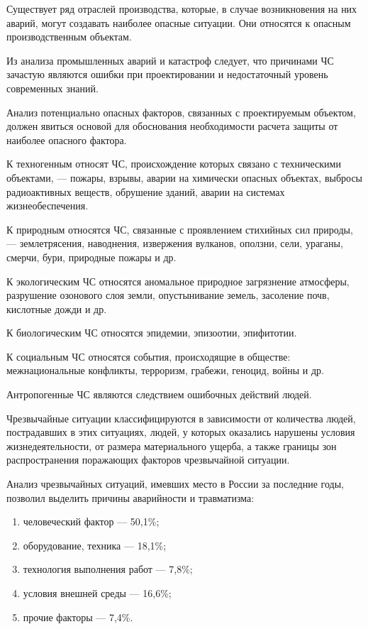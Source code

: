 Существует ряд отраслей производства, которые, в случае возникновения на них аварий, могут создавать наиболее опасные ситуации.
Они относятся к опасным производственным объектам. 

Из анализа промышленных аварий и катастроф следует, что причинами ЧС зачастую являются ошибки при проектировании и недостаточный уровень современных знаний.

Анализ потенциально опасных факторов, связанных с проектируемым объектом, должен явиться основой для обоснования необходимости расчета защиты от наиболее опасного фактора.

К техногенным относят ЧС, происхождение которых связано с техническими объектами, --- пожары, взрывы, аварии на химически опасных объектах, выбросы радиоактивных веществ, обрушение зданий, аварии на системах жизнеобеспечения.

К природным относятся ЧС, связанные с проявлением стихийных сил природы, --- землетрясения, наводнения, извержения вулканов, оползни, сели, ураганы, смерчи, бури, природные пожары и др.

К экологическим ЧС относятся аномальное природное загрязнение атмосферы, разрушение озонового слоя земли, опустынивание земель, засоление почв, кислотные дожди и др.

К биологическим ЧС относятся эпидемии, эпизоотии, эпифитотии.

К социальным ЧС относятся события, происходящие в обществе: межнациональные конфликты, терроризм, грабежи, геноцид, войны и др.

Антропогенные ЧС являются следствием ошибочных действий людей.

Чрезвычайные ситуации классифицируются в зависимости от количества людей, пострадавших в этих ситуациях, людей, у которых оказались нарушены условия жизнедеятельности, от размера материального ущерба, а также границы зон распространения поражающих факторов чрезвычайной ситуации.

Анализ чрезвычайных ситуаций, имевших место в России за последние годы, позволил выделить причины аварийности и травматизма:

\begin{enumerate}
	\item человеческий фактор — 50,1\%;
	\item оборудование, техника — 18,1\%;
	\item технология выполнения работ — 7,8\%;
	\item условия внешней среды — 16,6\%;
	\item прочие факторы — 7,4\%.
\end{enumerate}

